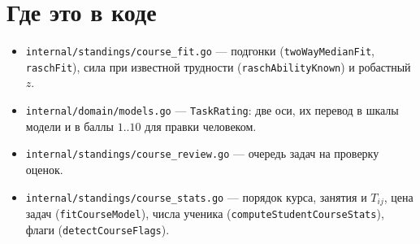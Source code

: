 \documentclass[11pt,a4paper]{article}
\begin{document}
\section{Где это в коде}

\begin{itemize}[itemsep=2pt]
  \item \texttt{internal/standings/course\_fit.go} --- подгонки
        (\texttt{twoWayMedianFit}, \texttt{raschFit}), сила при известной
        трудности (\texttt{raschAbilityKnown}) и робастный $z$.
  \item \texttt{internal/domain/models.go} --- \texttt{TaskRating}: две оси, их
        перевод в шкалы модели и в баллы $1..10$ для правки человеком.
  \item \texttt{internal/standings/course\_review.go} --- очередь задач на
        проверку оценок.
  \item \texttt{internal/standings/course\_stats.go} --- порядок курса, занятия
        и $T_{ij}$, цена задач (\texttt{fitCourseModel}), числа ученика
        (\texttt{computeStudentCourseStats}), флаги
        (\texttt{detectCourseFlags}).
\end{itemize}
\end{document}
